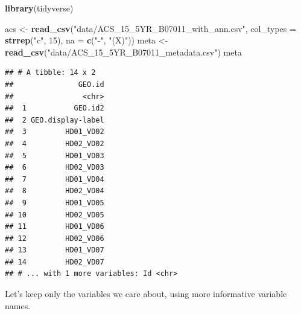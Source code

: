 \documentclass[]{book}
\newenvironment{Shaded}{\begin{snugshade}}{\end{snugshade}}
\newcommand{\KeywordTok}[1]{\textcolor[rgb]{0.13,0.29,0.53}{\textbf{{#1}}}}
\newcommand{\DataTypeTok}[1]{\textcolor[rgb]{0.13,0.29,0.53}{{#1}}}
\newcommand{\DecValTok}[1]{\textcolor[rgb]{0.00,0.00,0.81}{{#1}}}
\newcommand{\StringTok}[1]{\textcolor[rgb]{0.31,0.60,0.02}{{#1}}}
\newcommand{\NormalTok}[1]{{#1}}
\theoremstyle{definition}
\theoremstyle{definition}
\theoremstyle{remark}
\begin{document}
\begin{Shaded}
\begin{Highlighting}[]
\KeywordTok{library}\NormalTok{(tidyverse)}
\end{Highlighting}
\end{Shaded}

\begin{Shaded}
\begin{Highlighting}[]
\NormalTok{acs <-}\StringTok{ }\KeywordTok{read_csv}\NormalTok{(}\StringTok{"data/ACS_15_5YR_B07011_with_ann.csv"}\NormalTok{, }\DataTypeTok{col_types =} \KeywordTok{strrep}\NormalTok{(}\StringTok{"c"}\NormalTok{, }\DecValTok{15}\NormalTok{), }\DataTypeTok{na =} \KeywordTok{c}\NormalTok{(}\StringTok{"-"}\NormalTok{, }\StringTok{"(X)"}\NormalTok{))}
\NormalTok{meta <-}\StringTok{ }\KeywordTok{read_csv}\NormalTok{(}\StringTok{"data/ACS_15_5YR_B07011_metadata.csv"}\NormalTok{)}
\NormalTok{meta}
\end{Highlighting}
\end{Shaded}

\begin{verbatim}
## # A tibble: 14 x 2
##               GEO.id
##                <chr>
##  1           GEO.id2
##  2 GEO.display-label
##  3         HD01_VD02
##  4         HD02_VD02
##  5         HD01_VD03
##  6         HD02_VD03
##  7         HD01_VD04
##  8         HD02_VD04
##  9         HD01_VD05
## 10         HD02_VD05
## 11         HD01_VD06
## 12         HD02_VD06
## 13         HD01_VD07
## 14         HD02_VD07
## # ... with 1 more variables: Id <chr>
\end{verbatim}

Let's keep only the variables we care about, using more informative
variable names.

\begin{Shaded}
\end{Shaded}
\end{document}
